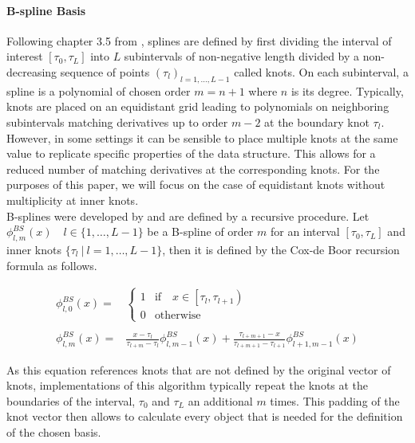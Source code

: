 \documentclass[11pt,twoside,a4paper]{article}
\begin{document}
	\paragraph{B-spline Basis} Following chapter 3.5 from \cite{ramsay_functional_2005}, splines are defined by first dividing the interval of interest $[\tau_0, \tau_L]$ into $L$ subintervals of non-negative length divided by a non-decreasing sequence of points $(\tau_l)_{l = 1,\dots, L-1}$ called knots. On each subinterval, a spline is a polynomial of chosen order $m = n+1$ where $n$ is its degree. Typically, knots are placed on an equidistant grid leading to polynomials on neighboring subintervals matching derivatives up to order $m-2$ at the boundary knot $\tau_l$. However, in some settings it can be sensible to place multiple knots at the same value to replicate specific properties of the data structure. This allows for a reduced number of matching derivatives at the corresponding knots. For the purposes of this paper, we will focus on the case of equidistant knots without multiplicity at inner knots.\\
	
	B-splines were developed by \cite{de_boor_practical_1978} and are defined by a recursive procedure. Let $\phi_{l,m}^{BS}(x) \quad l \in \{1,\dots,L-1\}$ be a B-spline of order $m$ for an interval $[\tau_0, \tau_L]$ and inner knots $\{\tau_l \: \vert \: l = 1,\dots, L-1\}$, then it is defined by the Cox-de Boor recursion formula as follows. 
	
	\begin{equation}
		\begin{split}
			\phi_{l,0}^{BS}(x) = &
			\begin{cases}
				1 & \text{if} \quad x \in \left[\tau_l, \tau_{l+1}\right)\\
				0 & \text{otherwise}
			\end{cases}\\ \\
			\phi_{l,m}^{BS}(x) = &\frac{x - \tau_l}{\tau_{l+m} - \tau_l} \phi_{l,m-1}^{BS}(x) + \frac{\tau_{l+m+1} - x}{\tau_{l+m+1} - \tau_{l+1}} \phi_{l+1,m-1}^{BS}(x)
		\end{split}
	\end{equation}
	
	As this equation references knots that are not defined by the original vector of knots, implementations of this algorithm typically repeat the knots at the boundaries of the interval, $\tau_0$ and $\tau_L$ an additional $m$ times. This padding of the knot vector then allows to calculate every object that is needed for the definition of the chosen basis.\\
	
\end{document}
